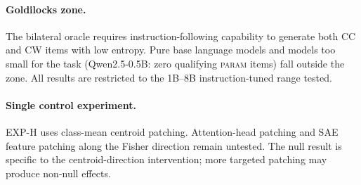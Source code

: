 \documentclass[11pt,twocolumn]{article}
\begin{document}
\paragraph{Goldilocks zone.}
The bilateral oracle requires instruction-following capability to generate both
CC and CW items with low entropy. Pure base language models and models too small
for the task (Qwen2.5-0.5B: zero qualifying \textsc{param} items) fall outside
the zone. All results are restricted to the 1B--8B instruction-tuned range tested.

\paragraph{Single control experiment.}
EXP-H uses class-mean centroid patching. Attention-head patching and SAE feature
patching along the Fisher direction remain untested. The null result is
specific to the centroid-direction intervention; more targeted patching may
produce non-null effects.


\end{document}
